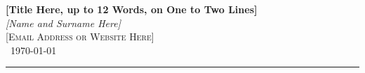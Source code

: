 \documentclass[11pt]{article} %
\begin{document}
	
	
	\begin{titlepage} %
		\newcommand{\HRule}{\rule{\linewidth}{0.2mm}} %
		
		\center %
		
		
		

		
		
		
		{\huge\bfseries [Title Here, up to 12 Words, on One to Two Lines] }\\[0.4cm] %
		
		
		
		{\large\textit{[Name and Surname Here]}}\\ %
		\textsc{[Email Address or Website Here]} \\[0.5cm] %
		
		
		{\large\ \today} %
		
		\HRule\\[0.5cm]
		
	
		
		
		
		
		
		
	\end{titlepage}
	
\end{document}
